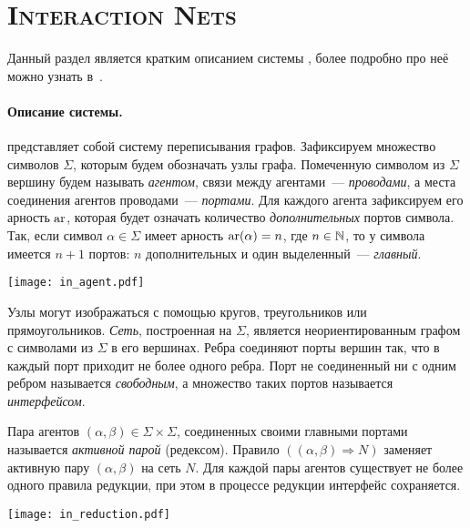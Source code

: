 
\section{\texorpdfstring{\textsc{Interaction Nets}}{Interaction Nets}}
\label{sec:ins}

Данный раздел является кратким описанием системы \INs{}, более подробно про неё можно узнать в~\cite{lafontInteractionCombinators1997a, satoDesignImplementationLowlevel2015, salikhmetovInteractionNetsRussian2013}.

\paragraph{Описание системы.}

\INs{} представляет собой систему переписывания графов.
Зафиксируем множество символов $\Sigma$, которым будем обозначать узлы графа.
Помеченную символом из $\Sigma$ вершину будем называть \textit{агентом}, связи между агентами~--- \textit{проводами}, а места соединения агентов проводами~--- \textit{портами}.
Для каждого агента зафиксируем его арность $\operatorname{ar}$, которая будет означать количество \textit{дополнительных} портов символа.
Так, если символ $\alpha \in \Sigma$ имеет арность $\operatorname{ar}(\alpha) = n$, где $n \in \mathbb{N}$, то у символа имеется $n+1$ портов: $n$ дополнительных и один выделенный~--- \textit{главный}.

\begin{center}
      \texttt{[image: in\_agent.pdf]}
\end{center}

Узлы могут изображаться с помощью кругов, треугольников или прямоугольников.
\textit{Сеть}, построенная на $\Sigma$, является неориентированным графом с символами из $\Sigma$ в его вершинах.
Ребра соединяют порты вершин так, что в каждый порт приходит не более одного ребра.
Порт не соединенный ни с одним ребром называется \textit{свободным}, а множество таких портов называется \textit{интерфейсом}.

Пара агентов $(\alpha, \beta) \in \Sigma \times \Sigma$, соединенных своими главными портами называется \textit{активной парой} (редексом).
Правило $((\alpha, \beta) \Longrightarrow N)$ заменяет активную пару $(\alpha, \beta)$ на сеть $N$.
Для каждой пары агентов существует не более одного правила редукции, при этом в процессе редукции интерфейс сохраняется.

\begin{center}
      \texttt{[image: in\_reduction.pdf]}
\end{center}

